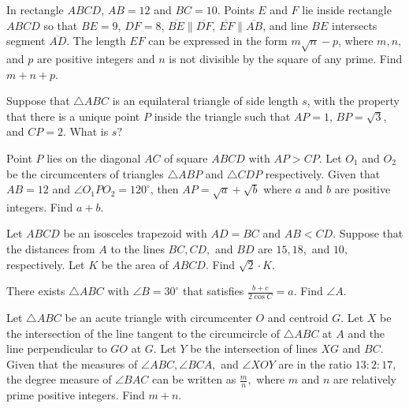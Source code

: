 \documentclass[11pt]{article}
\begin{document}
\begin{req}[AIME I 2011/2]{2}
In rectangle $ABCD$, $AB=12$ and $BC=10$. Points $E$ and $F$ lie inside rectangle $ABCD$ so that $BE=9$, $DF=8$, $\overline{BE} \parallel \overline{DF}$, $\overline{EF} \parallel \overline{AB}$, and line $BE$ intersects segment $\overline{AD}$. The length $EF$ can be expressed in the form $m\sqrt{n}-p$, where $m,n,$ and $p$ are positive integers and $n$ is not divisible by the square of any prime. Find $m+n+p$.
\end{req}
\begin{prob}[AMC 12A 2020/24]{3}
Suppose that $\triangle ABC$ is an equilateral triangle of side length $s$, with the property that there is a unique point $P$ inside the triangle such that $AP = 1$, $BP = \sqrt{3}$, and $CP = 2$. What is $s?$
\end{prob}
\begin{prob}[AIME II 2011/13]{4}
Point $P$ lies on the diagonal $AC$ of square $ABCD$ with $AP>CP$. Let $O_1$ and $O_2$ be the circumcenters of triangles $\triangle ABP$ and $\triangle CDP$ respectively. Given that $AB=12$ and $\angle O_1 P O_2 = 120^\circ$, then $AP=\sqrt{a}+\sqrt{b}$ where $a$ and $b$ are positive integers. Find $a+b$.
\end{prob}
\begin{prob}[AIME I 2021/9]{4}
Let $ABCD$ be an isosceles trapezoid with $AD=BC$ and $AB<CD.$ Suppose that the distances from $A$ to the lines $BC,CD,$ and $BD$ are $15,18,$ and $10,$ respectively. Let $K$ be the area of $ABCD.$ Find $\sqrt2 \cdot K.$
\end{prob}
\begin{prob}[CMC 12A 2020/23]{4}
There exists $\triangle ABC$ with $\angle B = 30^{\circ}$ that satisfies $\frac{b+c}{2\cos C}=a$. Find $\angle A$.
\end{prob}
\begin{prob}[AIME II 2021/14]{6}
Let $\triangle ABC$ be an acute triangle with circumcenter $O$ and centroid $G$. Let $X$ be the intersection of the line tangent to the circumcircle of $\triangle ABC$ at $A$ and the line perpendicular to $GO$ at $G$. Let $Y$ be the intersection of lines $XG$ and $BC$. Given that the measures of $\angle ABC, \angle BCA, $ and $\angle XOY$ are in the ratio $13 : 2 : 17, $ the degree measure of $\angle BAC$ can be written as $\frac{m}{n},$ where $m$ and $n$ are relatively prime positive integers. Find $m+n$.
\end{prob}
\end{document}
